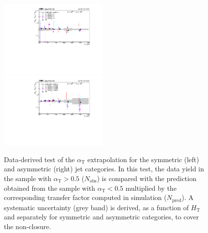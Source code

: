 \clearpage
\begin{figure}[tbhp]
    \caption{ 
  Data-derived test of the $\alpha_{\mathrm{T}}$ extrapolation for the symmetric (left) and asymmetric (right) jet categories. 
  In this test, the data yield in the \mj sample with $\alpha_{\mathrm{T}}>0.5$ ($N_{\mathrm{obs}}$) 
  is compared with the prediction obtained from the \mj sample with $\alpha_{\mathrm{T}}<0.5$ multiplied by the corresponding 
  transfer factor computed in simulation ($N_{\mathrm{pred}}$). 
  A systematic uncertainty (grey band) is derived, as a function of $H_{\mathrm{T}}$ and separately for symmetric and asymmetric categories, 
  to cover the non-closure. 
    \label{fig:CT-alphaT} }
  \begin{center}
     \includegraphics[width=0.48\textwidth]{alphaTsym__noFit_aux} ~~
     \includegraphics[width=0.48\textwidth]{alphaTasym__noFit_aux}
  \end{center}
\end{figure}


